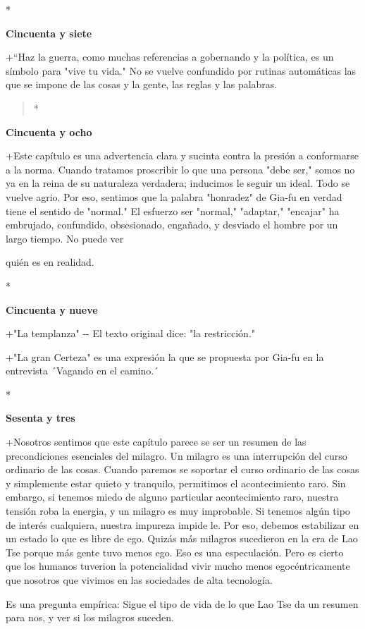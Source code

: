 *

\textbf{Cincuenta y siete}

+``Haz la guerra, como muchas referencias a gobernando y la política, es
un símbolo para "vive tu vida." No se vuelve confundido por rutinas
automáticas las que se impone de las cosas y la gente, las reglas y las
palabras.

\begin{quote}
*
\end{quote}

\textbf{Cincuenta y ocho}

+Este capítulo es una advertencia clara y sucinta contra la presión a
conformarse a la norma. Cuando tratamos proscribir lo que una persona
"debe ser," somos no ya en la reina de su naturaleza verdadera;
inducimos le seguir un ideal. Todo se vuelve agrio. Por eso, sentimos
que la palabra "honradez" de Gia-fu en verdad tiene el sentido de
"normal." El esfuerzo ser "normal," "adaptar," "encajar" ha embrujado,
confundido, obsesionado, engañado, y desviado el hombre por un largo
tiempo. No puede ver

quién es en realidad.

*

\textbf{Cincuenta y nueve}

+"La templanza" -\/- El texto original dice: "la restricción."

+"La gran Certeza" es una expresión la que se propuesta por Gia-fu en la
entrevista ´Vagando en el camino.´

*

\textbf{Sesenta y tres}

+Nosotros sentimos que este capítulo parece se ser un resumen de las
precondiciones esenciales del milagro. Un milagro es una interrupción
del curso ordinario de las cosas. Cuando paremos se soportar el curso
ordinario de las cosas y simplemente estar quieto y tranquilo,
permitimos el acontecimiento raro. Sin embargo, si tenemos miedo de
alguno particular acontecimiento raro, nuestra tensión roba la energia,
y un milagro es muy improbable. Si tenemos algún tipo de interés
cualquiera, nuestra impureza impide le. Por eso, debemos estabilizar en
un estado lo que es libre de ego. Quizás más milagros sucedieron en la
era de Lao Tse porque más gente tuvo menos ego. Eso es una especulación.
Pero es cierto que los humanos tuverion la potencialidad vivir mucho
menos egocéntricamente que nosotros que vivimos en las sociedades de
alta tecnología.

Es una pregunta empírica: Sigue el tipo de vida de lo que Lao Tse da un
resumen para nos, y ver si los milagros suceden.

